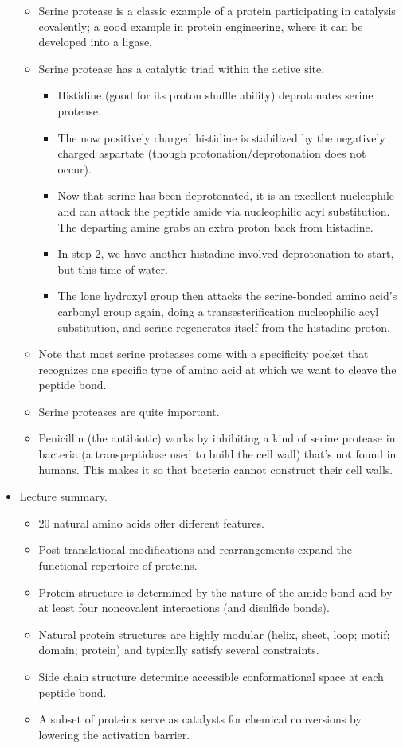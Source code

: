 \documentclass[../notes.tex]{subfiles}
\begin{document}
\begin{itemize}
\begin{itemize}
\begin{itemize}
        \end{itemize}
        \item Serine protease is a classic example of a protein participating in catalysis covalently; a good example in protein engineering, where it can be developed into a ligase.
        \item Serine protease has a catalytic triad within the active site.
        \begin{itemize}
            \item Histidine (good for its proton shuffle ability) deprotonates serine protease.
            \item The now positively charged histidine is stabilized by the negatively charged aspartate (though protonation/deprotonation does not occur).
            \item Now that serine has been deprotonated, it is an excellent nucleophile and can attack the peptide amide via nucleophilic acyl substitution. The departing amine grabs an extra proton back from histadine.
            \item In step 2, we have another histadine-involved deprotonation to start, but this time of water.
            \item The lone hydroxyl group then attacks the serine-bonded amino acid's carbonyl group again, doing a transesterification nucleophilic acyl substitution, and serine regenerates itself from the histadine proton.
        \end{itemize}
        \item Note that most serine proteases come with a specificity pocket that recognizes one specific type of amino acid at which we want to cleave the peptide bond.
        \item Serine proteases are quite important.
        \item Penicillin (the antibiotic) works by inhibiting a kind of serine protease in bacteria (a transpeptidase used to build the cell wall) that's not found in humans. This makes it so that bacteria cannot construct their cell walls.
    \end{itemize}
    \item Lecture summary.
    \begin{itemize}
        \item 20 natural amino acids offer different features.
        \item Post-translational modifications and rearrangements expand the functional repertoire of proteins.
        \item Protein structure is determined by the nature of the amide bond and by at least four noncovalent interactions (and disulfide bonds).
        \item Natural protein structures are highly modular (helix, sheet, loop; motif; domain; protein) and typically satisfy several constraints.
        \item Side chain structure determine accessible conformational space at each peptide bond.
        \item A subset of proteins serve as catalysts for chemical conversions by lowering the activation barrier.
    \end{itemize}
\end{itemize}
\end{document}
